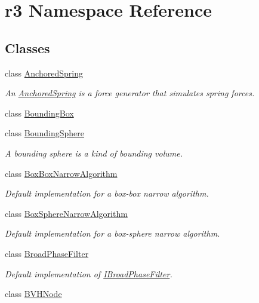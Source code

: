 \hypertarget{namespacer3}{}\section{r3 Namespace Reference}
\label{namespacer3}
\subsection*{Classes}
\begin{DoxyCompactItemize}
\item 
class \mbox{\hyperlink{classr3_1_1_anchored_spring}{Anchored\+Spring}}
\begin{DoxyCompactList}\small\item\em An \mbox{\hyperlink{classr3_1_1_anchored_spring}{Anchored\+Spring}} is a force generator that simulates spring forces. \end{DoxyCompactList}\item 
class \mbox{\hyperlink{classr3_1_1_bounding_box}{Bounding\+Box}}
\item 
class \mbox{\hyperlink{classr3_1_1_bounding_sphere}{Bounding\+Sphere}}
\begin{DoxyCompactList}\small\item\em A bounding sphere is a kind of bounding volume. \end{DoxyCompactList}\item 
class \mbox{\hyperlink{classr3_1_1_box_box_narrow_algorithm}{Box\+Box\+Narrow\+Algorithm}}
\begin{DoxyCompactList}\small\item\em Default implementation for a box-\/box narrow algorithm. \end{DoxyCompactList}\item 
class \mbox{\hyperlink{classr3_1_1_box_sphere_narrow_algorithm}{Box\+Sphere\+Narrow\+Algorithm}}
\begin{DoxyCompactList}\small\item\em Default implementation for a box-\/sphere narrow algorithm. \end{DoxyCompactList}\item 
class \mbox{\hyperlink{classr3_1_1_broad_phase_filter}{Broad\+Phase\+Filter}}
\begin{DoxyCompactList}\small\item\em Default implementation of \mbox{\hyperlink{classr3_1_1_i_broad_phase_filter}{I\+Broad\+Phase\+Filter}}. \end{DoxyCompactList}\item 
class \mbox{\hyperlink{classr3_1_1_b_v_h_node}{B\+V\+H\+Node}}

\end{DoxyCompactItemize}
